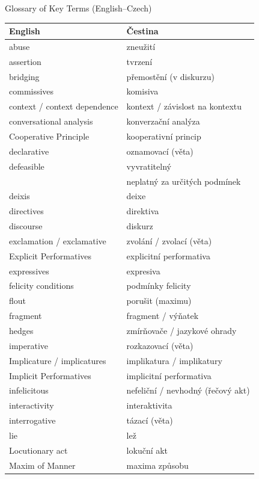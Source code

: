 \documentclass{beamer}
\begin{document}
\begin{frame}[allowframebreaks]{Glossary of Key Terms (English--Czech)}
\begin{longtable}{ll}
  English & Čestina \\\hline \endhead
abuse & zneužití \\
assertion & tvrzení \\
bridging & přemostění (v diskurzu) \\
commissives & komisiva \\
context / context dependence & kontext / závislost na kontextu \\
conversational analysis & konverzační analýza \\
Cooperative Principle & kooperativní princip \\
declarative & oznamovací (věta) \\
defeasible & vyvratitelný \\
           &  neplatný za určitých podmínek \\
deixis & deixe \\
directives & direktiva \\
discourse & diskurz \\
exclamation / exclamative & zvolání / zvolací (věta) \\
Explicit Performatives & explicitní performativa \\
expressives & expresiva \\
felicity conditions & podmínky felicity \\
flout & porušit (maximu) \\
fragment & fragment / výňatek \\
hedges & zmírňovače / jazykové ohrady \\
imperative & rozkazovací (věta) \\
Implicature / implicatures & implikatura / implikatury \\
Implicit Performatives & implicitní performativa \\
infelicitous & nefeliční / nevhodný (řečový akt) \\
interactivity & interaktivita \\
interrogative & tázací (věta) \\
lie & lež \\
Locutionary act & lokuční akt \\
Maxim of Manner & maxima způsobu \\

\end{longtable}
\end{frame}
\end{document}
